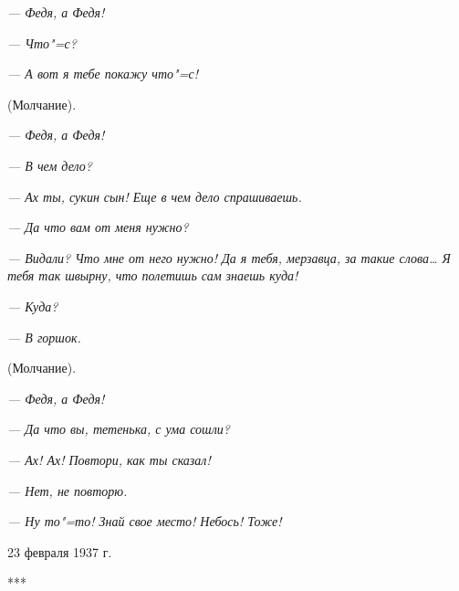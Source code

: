 \textit{--- Федя, а Федя!}

\textit{--- Что"=с?}

\textit{--- А вот я тебе покажу что"=с!}

(Молчание).

\textit{--- Федя, а Федя!}

\textit{--- В чем дело?}

\textit{--- Ах ты, сукин сын! Еще в чем дело спрашиваешь.}

\textit{--- Да что вам от меня нужно?}

\textit{--- Видали? Что мне от него нужно! Да я тебя, мерзавца, за такие слова\dots{} Я тебя так швырну, что полетишь сам знаешь куда!}

\textit{--- Куда?}

\textit{--- В горшок.}

(Молчание).

\textit{--- Федя, а Федя!}

\textit{--- Да что вы, тетенька, с ума сошли?}

\textit{--- Ах! Ах! Повтори, как ты сказал!}

\textit{--- Нет, не повторю.}

\textit{--- Ну то"=то! Знай свое место! Небось! Тоже!}

\begin{flushright}
23 февраля 1937 г.
\end{flushright}
\begin{center} 
***
\end{center}